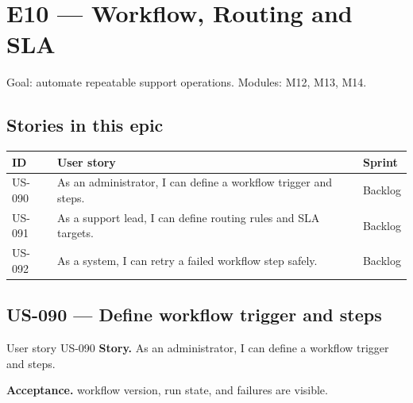 \chapter{E10 --- Workflow, Routing and SLA}

Goal: automate repeatable support operations. Modules: M12, M13, M14.

\section*{Stories in this epic}
{\small
\begin{longtable}{@{}>{\raggedright\arraybackslash}p{}>{\raggedright\arraybackslash}p{}>{\raggedright\arraybackslash}p{}@{}}
\toprule
\textbf{ID} & \textbf{User story} & \textbf{Sprint} \\
\midrule
\endhead
\bottomrule
\endfoot
US-090 & As an administrator, I can define a workflow trigger and steps. & Backlog \\
US-091 & As a support lead, I can define routing rules and SLA targets. & Backlog \\
US-092 & As a system, I can retry a failed workflow step safely. & Backlog \\
\end{longtable}
}





\Needspace{557pt}
\section{US-090 --- Define workflow trigger and steps}

\begin{storybox}{User story US-090}
\textbf{Story.} As an administrator, I can define a workflow trigger and steps.\par
\textbf{Acceptance.} workflow version, run state, and failures are visible.
\end{storybox}

